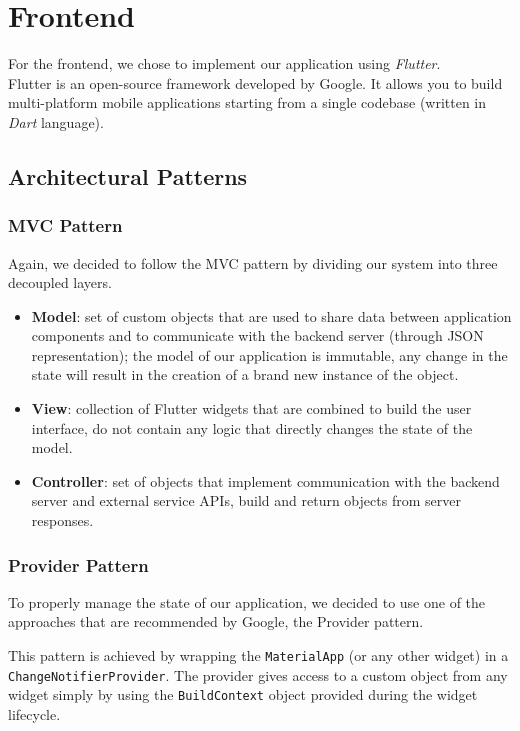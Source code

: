 \section{Frontend}
For the frontend, we chose to implement our application using \emph{Flutter}.\\
Flutter is an open-source framework developed by Google. 
It allows you to build multi-platform mobile applications starting from a single codebase (written in \emph{Dart} language).

\subsection{Architectural Patterns}

\subsubsection{MVC Pattern}
Again, we decided to follow the MVC pattern by dividing our system into three decoupled layers.
\begin{itemize}
    \item \textbf{Model}: 
        set of custom objects that are used to share data between application components and to communicate with the backend server (through JSON representation);
        the model of our application is immutable, any change in the state will result in the creation of a brand new instance of the object.
    \item \textbf{View}:
        collection of Flutter widgets that are combined to build the user interface, do not contain any logic that directly changes the state of the model.
    \item \textbf{Controller}:
        set of objects that implement communication with the backend server and external service APIs, build and return objects from server responses. 
\end{itemize}

\subsubsection{Provider Pattern}
To properly manage the state of our application, we decided to use one of the approaches that are recommended by Google, the Provider pattern.

This pattern is achieved by wrapping the \texttt{MaterialApp} (or any other widget) in a \texttt{ChangeNotifierProvider}.
The provider gives access to a custom object from any widget simply by using the \texttt{BuildContext} object provided during the widget lifecycle. 

